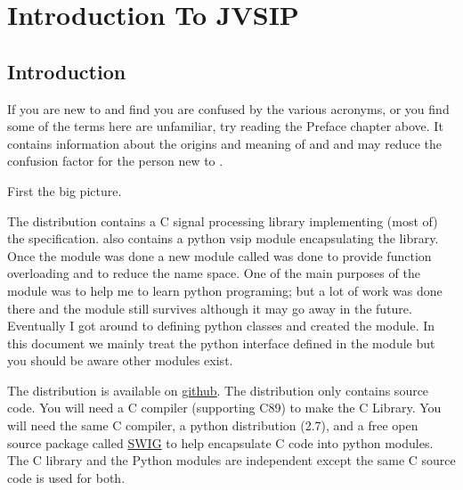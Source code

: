 \chapter{Introduction To JVSIP}
\section*{Introduction}
%
If you are new to  and find you are confused by the various acronyms, or you find some of the terms here are unfamiliar, try reading the Preface chapter above. It contains information about the origins and meaning of \jv{} and  and may reduce the confusion factor for the person new to .

First the big picture.

The \jv{} distribution contains a C signal processing library implementing (most of) the  specification. \jv{} also contains a python vsip module encapsulating the  library.  Once the {} module was done a new module called {} was done to provide function overloading and to reduce the name space.  One of the main purposes of the {} module was to help me to learn python programing; but a lot of work was done there and the module still survives although it may go away in the future.  Eventually I got around to defining python classes and created the \pyjv{} module.  In this document we mainly treat the python interface defined in the \pyjv{} module but you should be aware other modules exist.

The distribution is available on \href{https://github.com/rrjudd/jvsip?}{{github}}. The distribution only contains source code. You will need a C compiler (supporting C89) to make the C Library. You will need the same C compiler, a python distribution (2.7), and a free open source package called \href{http://www.swig.org}{SWIG} to help encapsulate C code into python modules. The C library and the Python modules are independent except the same C source code is used for both.

